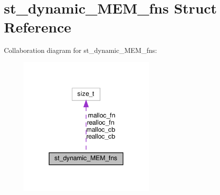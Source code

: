 \hypertarget{structst__dynamic__MEM__fns}{}\section{st\+\_\+dynamic\+\_\+\+M\+E\+M\+\_\+fns Struct Reference}
\label{structst__dynamic__MEM__fns}


Collaboration diagram for st\+\_\+dynamic\+\_\+\+M\+E\+M\+\_\+fns\+:
\nopagebreak
\begin{figure}[H]
\begin{center}
\leavevmode
\includegraphics[width=194pt]{structst__dynamic__MEM__fns__coll__graph}
\end{center}
\end{figure}
